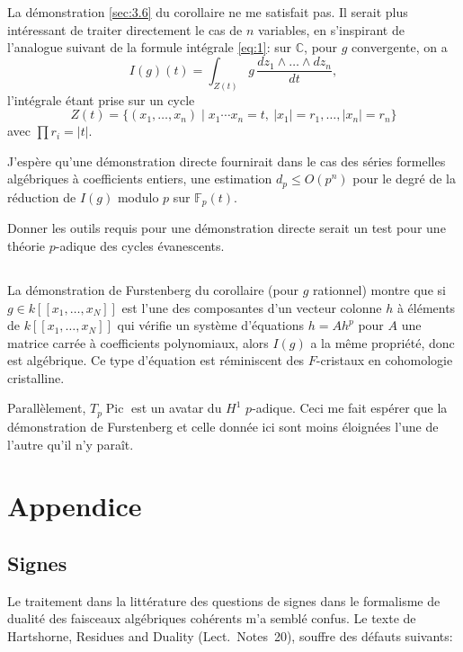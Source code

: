 \documentclass[12pt,a4paper]{article}
\theoremstyle{plain}
\theoremstyle{definition}
\theoremstyle{remark}
\DeclareMathOperator{\Pic}{Pic}
\newcommand{\CC}{\mathbb{C}}
\newcommand{\FF}{\mathbb{F}}
\providecommand{\CC}{\mathbb{C}}
\providecommand{\FF}{\mathbb{F}}
\begin{document}
La démonstration \ref{sec:3.6} du corollaire ne me satisfait pas. Il serait plus
intéressant de traiter directement le cas de $n$ variables, en s'inspirant de
l'analogue suivant de la formule intégrale \eqref{eq:1}: sur $\CC$, pour $g$ convergente, on a
\begin{equation}\label{eq:1prime}
I(g)(t)=\int_{Z(t)} g\,\frac{dz_1\wedge\dots\wedge dz_n}{dt},
\end{equation}
l'intégrale étant prise sur un cycle
\[
Z(t)=\{(x_1,\dots,x_n)\mid x_1\dotsm x_n=t,\ |x_1|=r_1,\dots,|x_n|=r_n\}
\]
avec $\prod r_i=|t|$.

J'espère qu'une démonstration directe fournirait dans le cas des séries
formelles algébriques à coefficients entiers, une estimation $d_p\le O(p^n)$ pour le
degré de la réduction de $I(g)$ modulo $p$ sur $\FF_p(t)$.

Donner les outils requis pour une démonstration directe serait un test pour
une théorie $p$-adique des cycles évanescents.

\subsection{}

La démonstration de Furstenberg du corollaire (pour $g$ rationnel) montre
que si $g\in k[[x_1,\dots,x_N]]$ est l'une des composantes d'un vecteur colonne $h$
à éléments de $k[[x_1,\dots,x_N]]$ qui vérifie un système d'équations $h=Ah^p$ pour $A$
une matrice carrée à coefficients polynomiaux, alors $I(g)$ a la même propriété,
donc est algébrique. Ce type d'équation est réminiscent des $F$-cristaux en
cohomologie cristalline.

Parallèlement, $T_p\Pic$ est un avatar du $H^1$ $p$-adique. Ceci me fait espérer
que la démonstration de Furstenberg et celle donnée ici sont moins éloignées
l'une de l'autre qu'il n'y paraît.

\section*{Appendice}

\subsection*{Signes}

Le traitement dans la littérature des questions de signes dans le formalisme
de dualité des faisceaux algébriques cohérents m'a semblé confus. Le texte de
Hartshorne, Residues and Duality (Lect.\ Notes~20), souffre des défauts
suivants:
\end{document}
